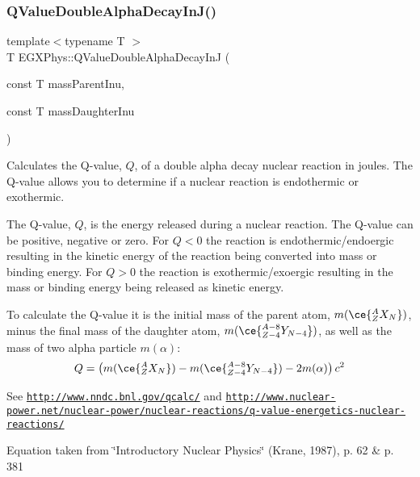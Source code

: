 \subsubsection{\texorpdfstring{Q\+Value\+Double\+Alpha\+Decay\+In\+J()}{QValueDoubleAlphaDecayInJ()}}
{\footnotesize\ttfamily template$<$typename T $>$ \\
T E\+G\+X\+Phys\+::\+Q\+Value\+Double\+Alpha\+Decay\+InJ (\begin{DoxyParamCaption}\item[{const T}]{mass\+Parent\+Inu,  }\item[{const T}]{mass\+Daughter\+Inu }\end{DoxyParamCaption})}



Calculates the Q-\/value, $Q$, of a double alpha decay nuclear reaction in joules. The Q-\/value allows you to determine if a nuclear reaction is endothermic or exothermic. 

The Q-\/value, $Q$, is the energy released during a nuclear reaction. The Q-\/value can be positive, negative or zero. For $Q < 0$ the reaction is endothermic/endoergic resulting in the kinetic energy of the reaction being converted into mass or binding energy. For $Q > 0$ the reaction is exothermic/exoergic resulting in the mass or binding energy being released as kinetic energy.

To calculate the Q-\/value it is the initial mass of the parent atom, $m(\ce{ ^{A}_{Z}X_{N} })$, minus the final mass of the daughter atom, $m(\ce{ ^{A-8}_{Z-4}Y_{N-4} })$, as well as the mass of two alpha particle $m(\alpha)$\+: \[Q = \left ( m(\ce{ ^{A}_{Z}X_{N} })-m(\ce{ ^{A-8}_{Z-4}Y_{N-4} })-2m(\alpha) \right) c^2\]

See \href{http://www.nndc.bnl.gov/qcalc/}{\tt http\+://www.\+nndc.\+bnl.\+gov/qcalc/} and \href{http://www.nuclear-power.net/nuclear-power/nuclear-reactions/q-value-energetics-nuclear-reactions/}{\tt http\+://www.\+nuclear-\/power.\+net/nuclear-\/power/nuclear-\/reactions/q-\/value-\/energetics-\/nuclear-\/reactions/}

Equation taken from \char`\"{}\+Introductory Nuclear Physics\char`\"{} (Krane, 1987), p. 62 \& p. 381



